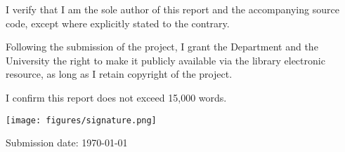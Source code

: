 I verify that I am the sole author of this report and the accompanying source code, except where explicitly stated to the contrary. 

Following the submission of the project, I grant the Department and the University the right to make it publicly available via the library electronic resource, as long as I retain copyright of the project.

I confirm this report does not exceed 15,000 words.

\begin{figure*}[h!]
    \centering
    \texttt{[image: figures/signature.png]}
\end{figure*}

Submission date: \today